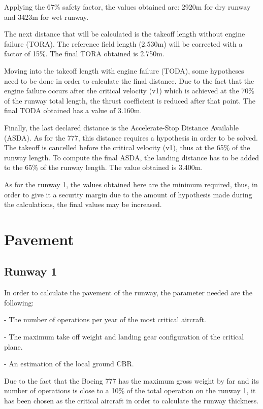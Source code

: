 	Applying the 67\% safety factor, the values obtained are:  2920m for dry runway and 3423m for wet runway.
	
	The next distance that will be calculated is the takeoff length without engine failure (TORA). The reference field length (2.530m) will be corrected with a factor of 15\%.  The final TORA obtained is 2.750m.
	
	Moving into the takeoff length with engine failure (TODA), some hypotheses need to be done in order to calculate the final distance.  Due to the fact that the engine failure occurs after the critical velocity (v1) which is achieved at the 70\% of the runway total length, the thrust coefficient is reduced after that point. The final TODA obtained has a value of 3.160m.
	
	Finally, the last declared distance is the Accelerate-Stop Distance Available (ASDA). As for the 777, this distance requires a hypothesis in order to be solved. The takeoff is cancelled before the critical velocity (v1), thus at the 65\% of the runway length. To compute the final ASDA, the landing distance has to be added to the 65\% of the runway length. The value obtained is 3.400m.     
	
	As for the runway 1, the values obtained here are the minimum required, thus, in order to give it a security margin due to the amount of hypothesis made during the calculations, the final values may be increased.
	
	\section{Pavement}
		\subsection{Runway 1}
		In order to calculate the pavement of the runway, the parameter needed are the following:
	
		- The number of operations per year of the most critical aircraft.  
	
		- The maximum take off weight and landing gear configuration of the critical plane. 
	
		- An estimation of the local ground CBR.
	
		Due to the fact that the Boeing 777 has the maximum gross weight by far and its number of operations is close to a 10\% of the total operation on the runway 1, it has been chosen as the critical aircraft in order to calculate the runway thickness.
	
